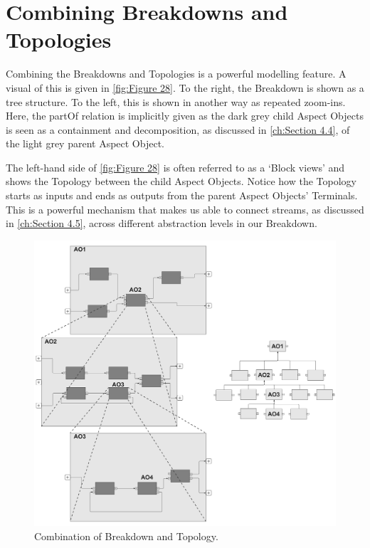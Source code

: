 \section{Combining Breakdowns and Topologies}
Combining the Breakdowns and Topologies is a powerful modelling feature. A visual of this
is given in \autoref{fig:Figure 28}. To the right, the Breakdown is shown as a tree structure. To the left, this is shown in another way as repeated zoom-ins. Here, the partOf relation is implicitly given as the dark grey child Aspect
Objects is seen as a containment and decomposition, as discussed in \autoref{ch:Section 4.4}, of the light grey parent Aspect
Object.

The left-hand side of \autoref{fig:Figure 28} is often referred to as a `Block views' and shows the Topology between the child
Aspect Objects. Notice how the Topology starts as inputs and ends as outputs from the parent Aspect Objects'
Terminals. This is a powerful mechanism that makes us able to connect streams, as discussed in \autoref{ch:Section 4.5}, across
different abstraction levels in our Breakdown.

\begin{figure}[htb]
  \centering
  \includegraphics[width=1\textwidth]{img/IMFmanual-img047.jpg}
  \caption{Combination of Breakdown and Topology.}
  \label{fig:Figure 28}
\end{figure}

